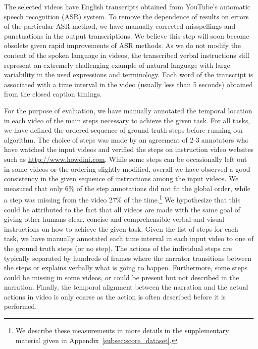 \documentclass[10pt,twocolumn,letterpaper]{article}
\begin{document}
%
%
The selected videos have English transcripts obtained from YouTube's automatic speech recognition (ASR) system.
To remove the dependence of results on errors of the particular ASR method, we have manually corrected misspellings and punctuations in the output transcriptions.
We believe this step will soon become obsolete given rapid improvements of ASR methods. 
As we do not modify the content of the spoken language in videos, the transcribed verbal instructions still represent an extremely challenging example of natural language with large variability in the used expressions and terminology.
%
Each word of the transcript is associated with a time interval in the video (usually less than 5 seconds) obtained from the closed caption timings.

%
%
%
For the purpose of evaluation, we have manually annotated the temporal location in each video of the main steps necessary to achieve the given task.
For all tasks, we have defined the ordered sequence of ground truth steps before running our algorithm.
The choice of steps was made by an agreement of 2-3 annotators who have watched the input videos and verified the steps on instruction video websites such as \url{http://www.howdini.com}.
 While some steps can be occasionally left out in some videos or the ordering slightly modified, overall we have observed a good consistency 
 in the given sequence of instructions among the input videos.
We measured that only 6\% of the step annotations did not fit the global order, while a step was missing from the video 27\% of the time.\footnote{We describe these measurements in more details in the supplementary material given in Appendix~\ref{subsec:score_dataset}.}
%
%
We hypothesize that this could be attributed to the fact that all videos are made with the same goal of giving other humans clear, concise and comprehensible verbal and visual instructions on how to achieve the given task.  
Given the list of steps for each task, we have manually annotated each time interval in each input video to one of the ground truth steps (or no step).
%
%
%
%
%
%
%
%
%
%
The actions of the individual steps are typically separated by hundreds of frames where the narrator transitions between the steps or explains verbally what is going to happen.  
Furthermore, some steps could be missing in some videos, or could be present but not described in the narration.  Finally, the temporal alignment between the narration and the actual actions in video is only coarse as the action is often described before it is performed. 
\end{document}
